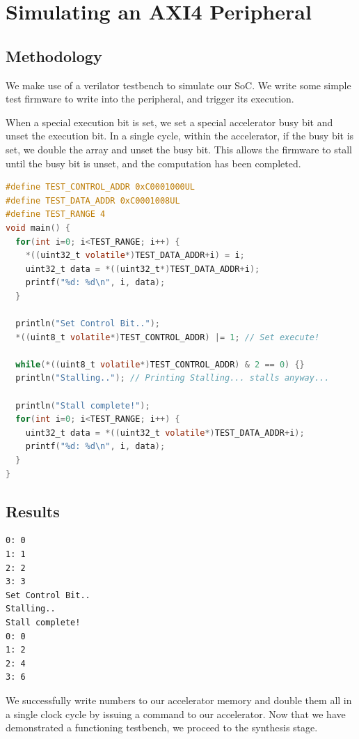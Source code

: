 \documentclass[a4paper,8pt]{report}
\begin{document}
\section{Simulating an AXI4 Peripheral}
\subsection{Methodology}
We make use of a verilator testbench to simulate our SoC. We write some simple
test firmware to write into the peripheral, and trigger its execution.

When a special execution bit is set, we set a special accelerator busy bit and
unset the execution bit. In a single cycle, within the accelerator, if the
busy bit is set, we double the array and unset the busy bit. This allows the
firmware to stall until the busy bit is unset, and the computation has been
completed.

\begin{lstlisting}[language=C,style=customc]
#define TEST_CONTROL_ADDR 0xC0001000UL
#define TEST_DATA_ADDR 0xC0001008UL
#define TEST_RANGE 4
void main() {
  for(int i=0; i<TEST_RANGE; i++) {
    *((uint32_t volatile*)TEST_DATA_ADDR+i) = i;
    uint32_t data = *((uint32_t*)TEST_DATA_ADDR+i);
    printf("%d: %d\n", i, data);
  }

  println("Set Control Bit..");
  *((uint8_t volatile*)TEST_CONTROL_ADDR) |= 1; // Set execute!

  while(*((uint8_t volatile*)TEST_CONTROL_ADDR) & 2 == 0) {}
  println("Stalling.."); // Printing Stalling... stalls anyway...

  println("Stall complete!");
  for(int i=0; i<TEST_RANGE; i++) {
    uint32_t data = *((uint32_t volatile*)TEST_DATA_ADDR+i);
    printf("%d: %d\n", i, data);
  }
}
\end{lstlisting}


\subsection{Results}
\small
\begin{verbatim}
0: 0
1: 1
2: 2
3: 3
Set Control Bit..
Stalling..
Stall complete!
0: 0
1: 2
2: 4
3: 6
\end{verbatim}
\normalsize

We successfully write numbers to our accelerator memory and double them all in a
single clock cycle by issuing a command to our accelerator. Now that we have
demonstrated a functioning testbench, we proceed to the synthesis stage. 
\end{document}
